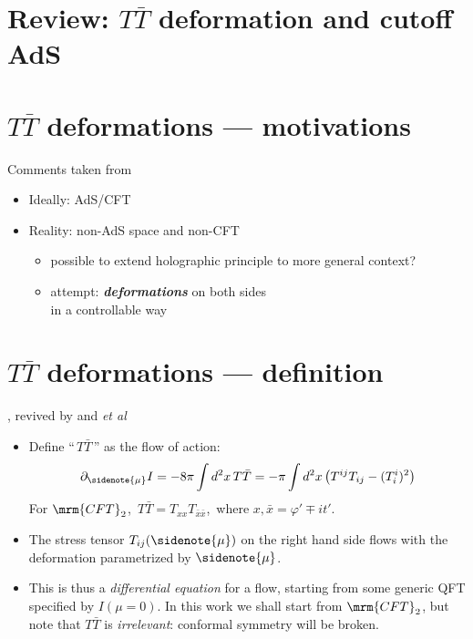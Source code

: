 \documentclass[10pt]{article}
\renewenvironment{frame}[1]%
	{\section*{#1}}%
	{\clearpage}
\newcommand{\pause}{}
\newenvironment{columns}%
	{\par\begin{minipage}{\textwidth}}%
	{\end{minipage}}
\newenvironment{column}[1]%
	{\begin{minipage}{#1}}%
	{\end{minipage}}
\newcommand{\TTbar}{\texorpdfstring{\ensuremath{T\bar{T}}}{TTbar}\xspace}
\begin{document}
\section{\textbf{Review:} \TTbar deformation and cutoff AdS} \label{se:cutoffholography}

\begin{frame}{\TTbar deformations --- motivations}{%
	Comments taken from \textcite{Cui:2023jrb}
}
\begin{columns}
\figAdsCft
\begin{column}{.72\textwidth}
	\begin{itemize}
	\item Ideally: AdS/CFT
	\item Reality: non-AdS space and non-CFT
	\begin{itemize}
		\item possible to extend holographic principle to more general context?
		\item attempt: \textbf{\textit{deformations}} on both sides\\
		in a controllable way
	\end{itemize}
	\end{itemize}
\end{column}
\end{columns}
\end{frame}

\newcommand{\citeTTbar}{%
	\textcite{Zamolodchikov:2004ce}, revived by \textcite{Smirnov:2016lqw} and \textcite{Cavaglia:2016oda} \textit{et al}
}


\begin{frame}{\TTbar deformations --- definition}{%
	\citeTTbar
}
\begin{itemize}

\item Define ``\,\TTbar\,'' as the flow of action:
\begin{equation}
	\partial_{\sidenote{\mu}} I = -{8 \pi} \int d^2x \, T\bar T =  -{\pi} \int d^2x\,\big( T^{ij}T_{ij}- (T^i_i)^2 \big)
	\label{TTbardef}
\end{equation}
For $\mrm{CFT}_2$,\ $T\bar{T} = T_{xx} T_{\bar{x}\bar{x}}$,\ where $x, \bar{x} = \varphi' \mp it'$.

\item The stress tensor $T_{ij}(\sidenote{\mu})$ on the right hand side flows with the deformation parametrized by $\sidenote{\mu}$. 

\pause

\item This is thus a \textit{differential equation} for a flow, starting from some generic QFT specified by $I(\mu = 0)$. In this work we shall start from $\mrm{CFT}_2$, but note that \TTbar is \textit{irrelevant}: conformal symmetry will be broken.

\end{itemize}
\end{frame}
\end{document}
